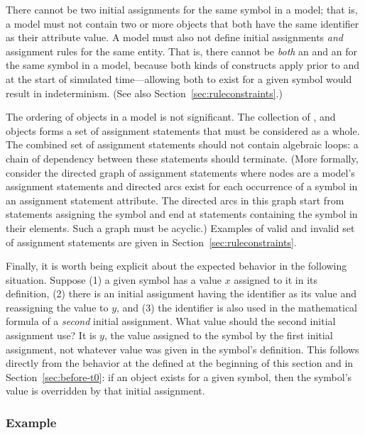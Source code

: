 There cannot be two initial assignments for the same symbol in a
model; that is, a model must not contain two or more
\InitialAssignment objects that both have the same identifier as
their  attribute value.  A model must also not define
initial assignments \emph{and} assignment rules for the same
entity.  That is, there cannot be \emph{both} an
\InitialAssignment and an \AssignmentRule for the same symbol in a
model, because both kinds of constructs apply prior to and at the
start of simulated time---allowing both to exist for a given
symbol would result in indeterminism.  (See also
Section~\ref{sec:ruleconstraints}.)

The ordering of \InitialAssignment objects in a model is not
significant.  The collection of \InitialAssignment,
\AssignmentRule and \KineticLaw objects forms a set of assignment
statements that must be considered as a whole.  The combined set
of assignment statements should not contain algebraic loops: a
chain of dependency between these statements should terminate.
(More formally, consider the directed graph of assignment
statements where nodes are a model's assignment statements and
directed arcs exist for each occurrence of a symbol in an
assignment statement  attribute.  The directed arcs in
this graph start from statements assigning the symbol and end at
statements containing the symbol in their  elements.
Such a graph must be acyclic.) Examples of valid and invalid set
of assignment statements are given in
Section~\ref{sec:ruleconstraints}.

Finally, it is worth being explicit about the expected behavior in
the following situation.  Suppose (1) a given symbol has a value
$x$ assigned to it in its definition, (2) there is an initial
assignment having the identifier as its  value and
reassigning the value to $y$, and (3) the identifier is
also used in the mathematical formula of a \emph{second} initial
assignment.  What value should the second initial assignment use?
It is $y$, the value assigned to the symbol by the first initial
assignment, not whatever value was given in the symbol's
definition.  This follows directly from the behavior at the
defined at the beginning of this section and in
Section~\ref{sec:before-t0}: if an \InitialAssignment object
exists for a given symbol, then the symbol's value is overridden
by that initial assignment.


\subsubsection{Example}

